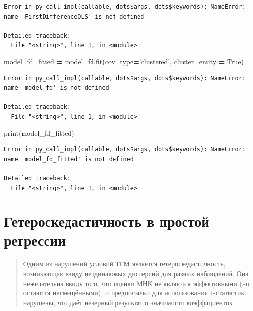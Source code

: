 \documentclass[]{book}
\newenvironment{Shaded}{\begin{snugshade}}{\end{snugshade}}
\newcommand{\BuiltInTok}[1]{#1}
\newcommand{\NormalTok}[1]{#1}
\newcommand{\OperatorTok}[1]{\textcolor[rgb]{0.81,0.36,0.00}{\textbf{#1}}}
\newcommand{\StringTok}[1]{\textcolor[rgb]{0.31,0.60,0.02}{#1}}
\newcommand{\VariableTok}[1]{\textcolor[rgb]{0.00,0.00,0.00}{#1}}
\begin{document}
\begin{verbatim}
Error in py_call_impl(callable, dots$args, dots$keywords): NameError: name 'FirstDifferenceOLS' is not defined

Detailed traceback: 
  File "<string>", line 1, in <module>
\end{verbatim}

\begin{Shaded}
\begin{Highlighting}[]
\NormalTok{model_fd_fitted }\OperatorTok{=}\NormalTok{ model_fd.fit(cov_type}\OperatorTok{=}\StringTok{'clustered'}\NormalTok{, cluster_entity }\OperatorTok{=} \VariableTok{True}\NormalTok{)}
\end{Highlighting}
\end{Shaded}

\begin{verbatim}
Error in py_call_impl(callable, dots$args, dots$keywords): NameError: name 'model_fd' is not defined

Detailed traceback: 
  File "<string>", line 1, in <module>
\end{verbatim}

\begin{Shaded}
\begin{Highlighting}[]
\BuiltInTok{print}\NormalTok{(model_fd_fitted)}
\end{Highlighting}
\end{Shaded}

\begin{verbatim}
Error in py_call_impl(callable, dots$args, dots$keywords): NameError: name 'model_fd_fitted' is not defined

Detailed traceback: 
  File "<string>", line 1, in <module>
\end{verbatim}

\hypertarget{heterosked}{%
\chapter{Гетероскедастичность в простой регрессии}\label{heterosked}}

\begin{quote}
Одним из нарушений условий ТГМ является гетероскедастичность, возникающая ввиду неодинаковых дисперсий для разных наблюдений. Она нежелательна ввиду того, что оценки МНК не являются эффективными (но остаются несмещёнными), и предпосылки для использования \texttt{t}-статистик нарушены, что даёт неверный результат о значимости коэффициентов.
\end{quote}
\end{document}
